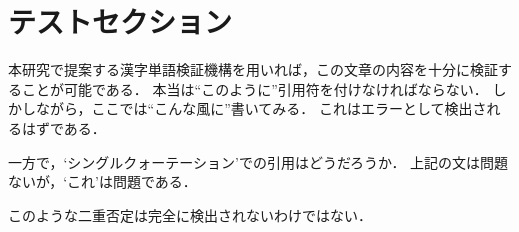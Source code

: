 \section{テストセクション}

本研究で提案する漢字単語検証機構を用いれば，この文章の内容を十分に検証することが可能である．
本当は``このように''引用符を付けなければならない．
しかしながら，ここでは“こんな風に”書いてみる．
これはエラーとして検出されるはずである．

一方で，`シングルクォーテーション'での引用はどうだろうか．
上記の文は問題ないが，‘これ’は問題である．

このような二重否定は完全に検出されないわけではない．
